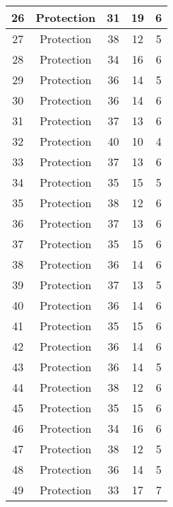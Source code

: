 \documentclass[results.tex]{subfiles}
\begin{document}
\begin{center}
\begin{tabular}{| c || c | c | c | c |}
    \hline
    26 & Protection & 31 & 19 & 6 \\ 
    \hline
    27 & Protection & 38 & 12 & 5 \\ 
    \hline
    28 & Protection & 34 & 16 & 6 \\ 
    \hline
    29 & Protection & 36 & 14 & 5 \\ 
    \hline
    30 & Protection & 36 & 14 & 6 \\ 
    \hline
    31 & Protection & 37 & 13 & 6 \\ 
    \hline
    32 & Protection & 40 & 10 & 4 \\ 
    \hline
    33 & Protection & 37 & 13 & 6 \\ 
    \hline
    34 & Protection & 35 & 15 & 5 \\ 
    \hline
    35 & Protection & 38 & 12 & 6 \\ 
    \hline
    36 & Protection & 37 & 13 & 6 \\ 
    \hline
    37 & Protection & 35 & 15 & 6 \\ 
    \hline
    38 & Protection & 36 & 14 & 6 \\ 
    \hline
    39 & Protection & 37 & 13 & 5 \\ 
    \hline
    40 & Protection & 36 & 14 & 6 \\ 
    \hline
    41 & Protection & 35 & 15 & 6 \\ 
    \hline
    42 & Protection & 36 & 14 & 6 \\ 
    \hline
    43 & Protection & 36 & 14 & 5 \\ 
    \hline
    44 & Protection & 38 & 12 & 6 \\ 
    \hline
    45 & Protection & 35 & 15 & 6 \\ 
    \hline
    46 & Protection & 34 & 16 & 6 \\ 
    \hline
    47 & Protection & 38 & 12 & 5 \\ 
    \hline
    48 & Protection & 36 & 14 & 5 \\ 
    \hline
    49 & Protection & 33 & 17 & 7 \\ 
    \hline   \end{tabular}
\end{center}
\end{document}
